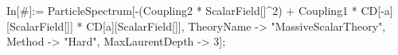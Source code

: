 In[\#]:= ParticleSpectrum[-(Coupling2 * ScalarField[]^2) + Coupling1 * CD[-a][ScalarField[]] * CD[a][ScalarField[]], TheoryName -> "MassiveScalarTheory", Method -> "Hard", MaxLaurentDepth -> 3]; 